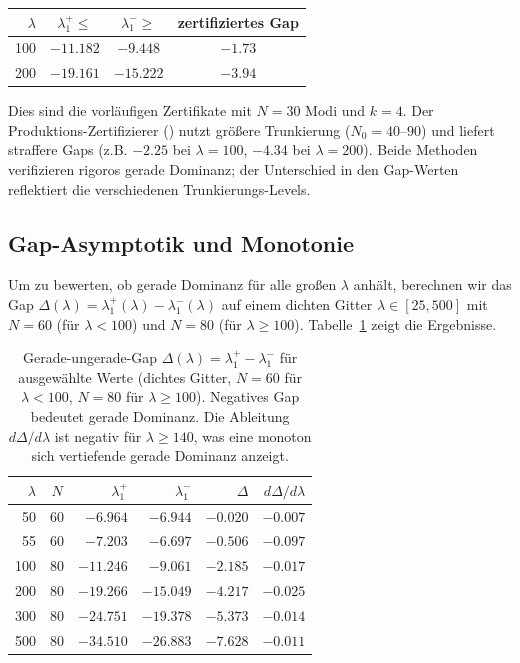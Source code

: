 \documentclass[12pt,a4paper]{article}
\theoremstyle{definition}
\theoremstyle{remark}
\begin{document}
\begin{center}
\renewcommand{\arraystretch}{1.2}
\begin{tabular}{r|c|c|c}
$\lambda$ & $\lambda_1^+ \leq$ & $\lambda_1^- \geq$ & zertifiziertes Gap \\\hline
100 & $-11.182$ & $-9.448$ & $\mathbf{-1.73}$ \\
200 & $-19.161$ & $-15.222$ & $\mathbf{-3.94}$
\end{tabular}
\end{center}

\noindent Dies sind die vorläufigen Zertifikate mit $N = 30$ Modi und $k = 4$. Der Produktions-Zertifizierer () nutzt größere Trunkierung ($N_0 = 40$--$90$) und liefert straffere Gaps (z.B. $-2.25$ bei $\lambda = 100$, $-4.34$ bei $\lambda = 200$). Beide Methoden verifizieren rigoros gerade Dominanz; der Unterschied in den Gap-Werten reflektiert die verschiedenen Trunkierungs-Levels.

\subsection{Gap-Asymptotik und Monotonie}
\label{sec:gap-asymptotics}

Um zu bewerten, ob gerade Dominanz für alle großen $\lambda$ anhält, berechnen wir das Gap $\Delta(\lambda) = \lambda_1^+(\lambda) - \lambda_1^-(\lambda)$ auf einem dichten Gitter $\lambda \in [25, 500]$ mit $N = 60$ (für $\lambda < 100$) und $N = 80$ (für $\lambda \geq 100$). Tabelle~\ref{tab:gap-asymp} zeigt die Ergebnisse.

\begin{table}[h]
\centering
\small
\renewcommand{\arraystretch}{1.15}
\begin{tabular}{r|c|r|r|r|r}
$\lambda$ & $N$ & $\lambda_1^+$ & $\lambda_1^-$ & $\Delta$ & $d\Delta/d\lambda$ \\\hline
50  & 60 & $-6.964$ & $-6.944$ & $-0.020$ & $-0.007$ \\
55  & 60 & $-7.203$ & $-6.697$ & $-0.506$ & $-0.097$ \\
100 & 80 & $-11.246$ & $-9.061$ & $-2.185$ & $-0.017$ \\
200 & 80 & $-19.266$ & $-15.049$ & $-4.217$ & $-0.025$ \\
300 & 80 & $-24.751$ & $-19.378$ & $-5.373$ & $-0.014$ \\
500 & 80 & $-34.510$ & $-26.883$ & $-7.628$ & $-0.011$
\end{tabular}
\caption{Gerade-ungerade-Gap $\Delta(\lambda) = \lambda_1^+ - \lambda_1^-$ für ausgewählte Werte (dichtes Gitter, $N=60$ für $\lambda < 100$, $N=80$ für $\lambda \geq 100$). Negatives Gap bedeutet gerade Dominanz. Die Ableitung $d\Delta/d\lambda$ ist negativ für $\lambda \geq 140$, was eine monoton sich vertiefende gerade Dominanz anzeigt.}
\label{tab:gap-asymp}
\end{table}
\end{document}
